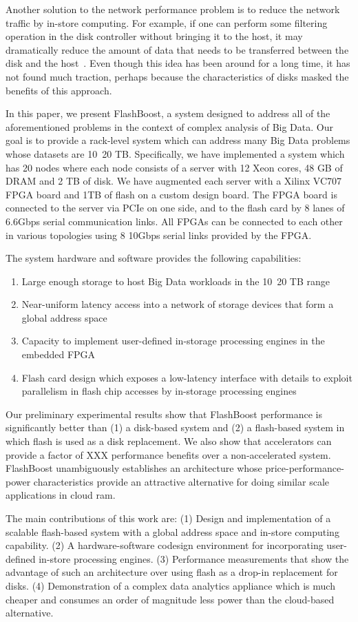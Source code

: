 Another solution to the network performance problem is to reduce the network
traffic by in-store computing. For example, if one can perform some filtering
operation in the disk controller without bringing it to the host, it may
dramatically reduce the amount of data that needs to be transferred between the
disk and the host~\cite{idisk,netezza,smartssd}. Even though this idea has been
around for a long time, it has not found much traction, perhaps because the
characteristics of disks masked the benefits of this approach.  

In this paper, we present FlashBoost, a system designed to address all of the
aforementioned problems in the context of complex analysis of Big Data. Our goal
is to provide a rack-level system which can address many Big Data problems whose
datasets are 10~20 TB. Specifically, we have implemented a system which has 20
nodes where each node consists of a server with 12 Xeon cores, 48 GB of DRAM and
2 TB of disk. We have augmented each server with a Xilinx VC707 FPGA board and
1TB of flash on a custom design board. The FPGA board is connected to the server
via PCIe on one side, and to the flash card by 8 lanes of 6.6Gbps serial
communication links. All FPGAs can be connected to each other in various
topologies using 8 10Gbps serial links provided by the FPGA. 

The system hardware and software provides the following capabilities:
\begin{enumerate}
\item Large enough storage to host Big Data workloads in the 10~20 TB range
\item Near-uniform latency access into a network of storage devices that form a
global address space
\item Capacity to implement user-defined in-storage processing engines in the
embedded FPGA
\item Flash card design which exposes a low-latency interface with details to
exploit parallelism in flash chip accesses by in-storage processing engines
\end{enumerate}

Our preliminary experimental results show that FlashBoost performance is
significantly better than (1) a disk-based system and (2) a flash-based system
in which flash is used as a disk replacement. We also show that accelerators can
provide a factor of XXX performance benefits over a non-accelerated system.
FlashBoost unambiguously establishes an architecture whose
price-performance-power characteristics provide an attractive alternative for
doing similar scale applications in cloud ram.

The main contributions of this work are: (1) Design and implementation of a
scalable flash-based system with a global address space and in-store computing
capability. (2) A hardware-software codesign environment for incorporating
user-defined in-store processing engines. (3) Performance measurements that show
the advantage of such an architecture over using flash as a drop-in replacement
for disks. (4) Demonstration of a complex data analytics appliance which is much
cheaper and consumes an order of magnitude less power than the cloud-based
alternative.

